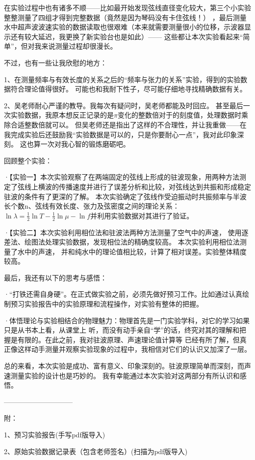 \documentclass[11pt]{article}
\begin{document}
在实验过程中也有诸多不顺——比如最开始发现弦线直径变化较大，第三个小实验整整测量了四组才得到完整数据（竟然是因为琴码没有卡住弦线！）
，最后测量水中超声波波速实验的数据读取也很艰难（本来就需要测量很小的位移，示波器显示还有较大延迟，我更换了新实验台也是如此）——
这些都让本次实验看起来“简单”，但对我来说测量过程却很漫长。

不过，也有一些让我欣慰的地方：

1、在测量频率与有效长度的关系之后的“频率与张力的关系”实验，得到的实验数据符合理论值得很好。
可能也和我耐下性子，尽可能仔细地寻找精确数据有关。

2、吴老师耐心严谨的教导。我每次有疑问时，吴老师都能及时回应。
甚至最后一次实验数据，我原本想反正记录的是$\pi $变化的整数倍对于的刻度值，处理数据时乘除合适整数倍就可以。
但吴老师还是指出了这样的不合理性，并让我重做——在我完成实验后还鼓励我“实验数据是可以的，只是你要耐心一点”，我对此印象深刻。
这也算一次对我心智的锻炼磨砺吧。
\smallskip

回顾整个实验：

·【实验一】本次实验观察了在两端固定的弦线上形成的驻波现象，用两种方法测定了弦线上横波的传播速度并进行了误差分析和比较，对弦线达到共振和形成稳定驻波的条件有了更深的了解。
本次实验确定了弦线作受迫振动时共振频率与半波长个数n、弦线有效长度、张力及弦密度之间的理论关系：
$\ln\lambda = \frac{1}{2}\ln T - \frac{1}{2}\ln\mu - \ln f$并利用实验数据对其进行了验证。

·【实验二】本次实验利用相位法和驻波法两种方法测量了空气中的声速，
使用逐差法、绘图法处理实验数据，发现相位法的精确度较高。
本次实验利用相位法测量了水中的声速，
并和纯水中的理论值相比较，计算了相对误差。实验整体精度较高。
\smallskip

最后，我还有以下的思考与感悟：

·“打铁还需自身硬”。在正式做实验之前，必须先做好预习工作。比如通过认真绘制预习实验报告中的实验原理和流程操作，对实验有整体的把握。

·体悟理论与实验相结合的物理魅力：物理首先是一门实验学科，对它的学习如果只是从书本上看，从课堂上
听，而没有动手亲自“学”的话，终究对其的理解和把握是有限的。在此之前，我对驻波原理、声速理论值计算等
已经有所了解，但真正像这样动手测量并观察实验现象的过程中，我相信对它们的认识又加深了一层。

总的来看，本次实验是成功、富有意义、印象深刻的。驻波原理简单而深刻，而声速测量实验的设计也是巧妙的。
我有幸能通过本次实验对这两部分有所认识和感悟。




















\vspace*{5cm}
——————————

附：

1、预习实验报告(手写pdf版导入)

2、原始实验数据记录表（包含老师签名）(扫描为pdf版导入)

\newpage



\end{document}
